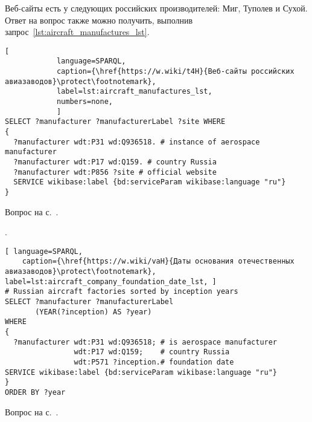 \hfil{}\hfil%



\newpage
\begin{task}
    \label{answer:aircraft_manufacturers}
    Веб-сайты есть у следующих российских производителей: 
    Миг, Туполев и Сухой. 
    Ответ на вопрос также можно получить, выполнив запрос~\ref{lst:aircraft_manufactures_lst}. 

\begin{lstlisting}[ 
            language=SPARQL, 
            caption={\href{https://w.wiki/t4H}{Веб-сайты российских авиазаводов}\protect\footnotemark}, 
            label=lst:aircraft_manufactures_lst, 
            numbers=none,
            ]
SELECT ?manufacturer ?manufacturerLabel ?site WHERE
{
  ?manufacturer wdt:P31 wd:Q936518. # instance of aerospace manufacturer
  ?manufacturer wdt:P17 wd:Q159. # country Russia
  ?manufacturer wdt:P856 ?site # official website
  SERVICE wikibase:label {bd:serviceParam wikibase:language "ru"}
}
\end{lstlisting}
    
    \small{\AnswerBackref Вопрос на с.~\pageref{lst:lang2}.}
\end{task}

\begin{task}
    \label{answer:aircraft_company_foundation_date}
    . 
    
	\begin{lstlisting}[ language=SPARQL, 
    caption={\href{https://w.wiki/vaH}{Даты основания отечественных авиазаводов}\protect\footnotemark}, label=lst:aircraft_company_foundation_date_lst, ]
# Russian aircraft factories sorted by inception years
SELECT ?manufacturer ?manufacturerLabel
       (YEAR(?inception) AS ?year)
WHERE
{
  ?manufacturer wdt:P31 wd:Q936518; # is aerospace manufacturer
                wdt:P17 wd:Q159;    # country Russia
                wdt:P571 ?inception.# foundation date
SERVICE wikibase:label {bd:serviceParam wikibase:language "ru"}
}
ORDER BY ?year
\end{lstlisting}
    
    \small{\AnswerBackref Вопрос на с.~\pageref{aircraft_question_2}.}
\end{task}

